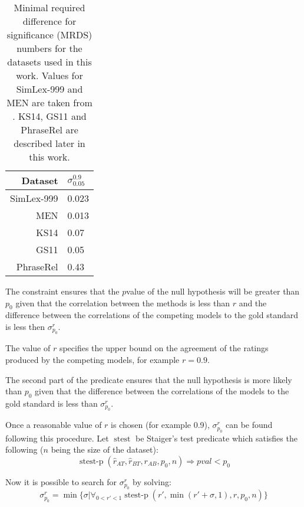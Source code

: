 \begin{table}
  \centering
  \begin{tabular}[th]{rl}
    \toprule
    Dataset & $\sigma^{0.9}_{0.05}$ \\
    \midrule
    SimLex-999 & 0.023\\
    MEN  & 0.013 \\
    KS14 &  0.07 \\
    GS11 &  0.05 \\
    PhraseRel & 0.43 \\
    \bottomrule
  \end{tabular}
  \caption[MRDS numbers]{Minimal required difference for significance (MRDS) numbers for the datasets used in this work. Values for SimLex-999 and MEN are taken from \citet{rastogi-vandurme-arora:2015:NAACL-HLT}. KS14, GS11 and PhraseRel are described later in this work.}
  \label{tab:mrds}
\end{table}

The constraint ensures that the $p$value of the null hypothesis will be greater than $p_0$ given that the correlation between the methods is less than $r$ and the difference between the correlations of the competing models to the gold standard is less then $\sigma^r_{p_0}$.

The value of $r$ specifies the upper bound on the agreement of the ratings produced by the competing models, for example $r = 0.9$.

The second part of the predicate ensures that the null hypothesis is more likely than $p_0$ given that the difference between the correlations of the models to the gold standard is less than $\sigma^r_{p_0}$.

Once a reasonable value of $r$ is chosen (for example 0.9), $\sigma^r_{p_0}$ can be found following this procedure. Let $\operatorname{stest}$ be Staiger's test predicate which satisfies the following ($n$ being the size of the dataset):
\begin{equation}
  \label{eq:stest}
  \operatorname{stest-p}(\hat{r}_{AT}, \hat{r}_{BT}, r_{AB}, p_0, n) \Rightarrow \mathit{pval} < p_0
\end{equation}

Now it is possible to search for $\sigma^r_{p_0}$ by solving:
\begin{equation}
  \label{eq:mrsd-min}
  \sigma^r_{p_0} = \min\{\sigma | \forall_{0 < r' < 1} \operatorname{stest-p}(r', \min(r'+\sigma, 1), r, p_0, n) \}
\end{equation}


